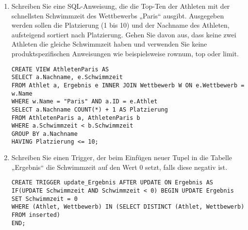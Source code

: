 \documentclass{bschlangaul-aufgabe}
\begin{document}
\begin{enumerate}

\item Schreiben Sie eine SQL-Anweisung, die die Top-Ten der Athleten mit
der schnellsten Schwimmzeit des Wettbewerbs „Paris“ ausgibt. Ausgegeben
werden sollen die Platzierung (1 bis 10) und der Nachname des Athleten,
aufsteigend sortiert nach Platzierung. Gehen Sie davon aus, dass keine
zwei Athleten die gleiche Schwimmzeit haben und verwenden Sie keine
produktspezifischen Anweisungen wie beispielsweise rownum, top oder
limit.

\begin{bAntwort}
\begin{verbatim}
CREATE VIEW AthletenParis AS
SELECT a.Nachname, e.Schwimmzeit
FROM Athlet a, Ergebnis e INNER JOIN Wettbewerb W ON e.Wettbewerb = w.Name
WHERE w.Name = "Paris" AND a.ID = e.Athlet
SELECT a.Nachname COUNT(*) + 1 AS Platzierung
FROM AthletenParis a, AthletenParis b
WHERE a.Schwimmzeit < b.Schwimmzeit
GROUP BY a.Nachname
HAVING Platzierung <= 10;
\end{verbatim}
\end{bAntwort}


\item Schreiben Sie einen Trigger, der beim Einfügen neuer Tupel in die
Tabelle „Ergebnis“ die Schwimmzeit auf den Wert 0 setzt, falls diese
negativ ist.

\begin{bAntwort}
\begin{verbatim}
CREATE TRIGGER update_Ergebnis AFTER UPDATE ON Ergebnis AS
IF(UPDATE Schwimmzeit AND Schwimmzeit < 0) BEGIN UPDATE Ergebnis
SET Schwimmzeit = 0
WHERE (Athlet, Wettbewerb) IN (SELECT DISTINCT (Athlet, Wettbewerb) FROM inserted)
END;
\end{verbatim}
\end{bAntwort}

\end{enumerate}
\end{document}
